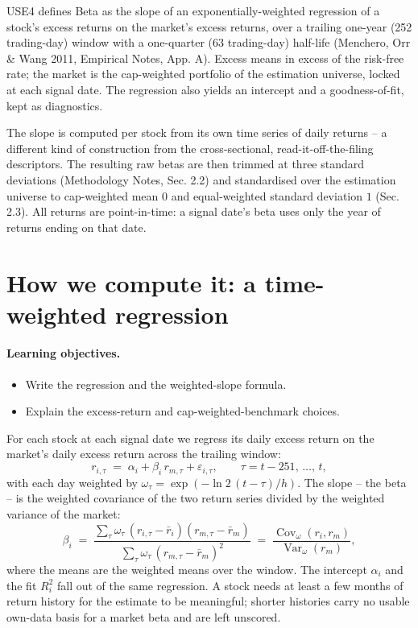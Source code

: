 \documentclass[11pt]{article}
\theoremstyle{definition}
\theoremstyle{plain}
\theoremstyle{remark}
\DeclareMathOperator{\Var}{Var}
\DeclareMathOperator{\Cov}{Cov}
\begin{document}
USE4 defines Beta as the slope of an exponentially-weighted regression of a stock's excess returns on the market's excess returns, over a trailing one-year (252 trading-day) window with a one-quarter (63 trading-day) half-life (Menchero, Orr \& Wang 2011, Empirical Notes, App. A). Excess means in excess of the risk-free rate; the market is the cap-weighted portfolio of the estimation universe, locked at each signal date. The regression also yields an intercept and a goodness-of-fit, kept as diagnostics.

The slope is computed per stock from its own time series of daily returns -- a different kind of construction from the cross-sectional, read-it-off-the-filing descriptors. The resulting raw betas are then trimmed at three standard deviations (Methodology Notes, Sec. 2.2) and standardised over the estimation universe to cap-weighted mean $0$ and equal-weighted standard deviation $1$ (Sec. 2.3). All returns are point-in-time: a signal date's beta uses only the year of returns ending on that date.

\section{How we compute it: a time-weighted regression}\label{sec:compute}

\paragraph{Learning objectives.}
\begin{itemize}[leftmargin=1.4em,topsep=2pt]
  \item Write the regression and the weighted-slope formula.
  \item Explain the excess-return and cap-weighted-benchmark choices.
\end{itemize}

For each stock at each signal date we regress its daily excess return on the market's daily excess return across the trailing window:
\[
r_{i,\tau} \;=\; \alpha_i + \beta_i\, r_{m,\tau} + \varepsilon_{i,\tau},
\qquad \tau = t-251,\,\dots,\,t,
\]
with each day weighted by $\omega_\tau = \exp(-\ln 2\,(t-\tau)/h)$. The slope -- the beta -- is the weighted covariance of the two return series divided by the weighted variance of the market:
\[
\beta_i \;=\; \frac{\sum_\tau \omega_\tau\,(r_{i,\tau}-\bar r_i)(r_{m,\tau}-\bar r_m)}{\sum_\tau \omega_\tau\,(r_{m,\tau}-\bar r_m)^2}
\;=\; \frac{\Cov_\omega(r_i, r_m)}{\Var_\omega(r_m)},
\]
where the means are the weighted means over the window. The intercept $\alpha_i$ and the fit $R^2_i$ fall out of the same regression. A stock needs at least a few months of return history for the estimate to be meaningful; shorter histories carry no usable own-data basis for a market beta and are left unscored.
\end{document}
